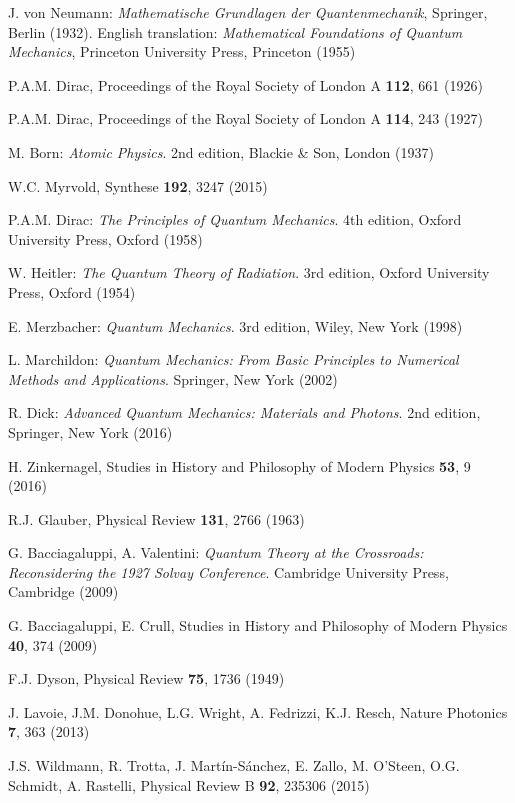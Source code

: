 \documentclass[final,3p,times,twocolumn]{elsarticle3}
\begin{document}
\begin{thebibliography}{88}
J. von Neumann: {\it Mathematische Grundlagen der Quantenmechanik},
Springer, Berlin (1932). English translation:
{\it Mathematical Foundations of Quantum Mechanics},
Princeton University Press, Princeton (1955)

P.A.M. Dirac,
Proceedings of the Royal Society of London A {\bf 112}, 661 (1926)

P.A.M. Dirac,
Proceedings of the Royal Society of London A {\bf 114}, 243 (1927)

M. Born: {\it Atomic Physics}. 2nd edition, Blackie \& Son, London (1937)

W.C. Myrvold, Synthese {\bf 192}, 3247 (2015)

P.A.M. Dirac: {\it The Principles of Quantum Mechanics}. 4th edition,
Oxford University Press, Oxford (1958)

W. Heitler: {\it The Quantum Theory of Radiation}. 3rd edition,
Oxford University Press, Oxford (1954)

E. Merzbacher: {\it Quantum Mechanics}. 3rd edition, Wiley, New York (1998)

L. Marchildon: {\it Quantum Mechanics: From Basic Principles to Numerical 
Methods and Applications}. Springer, New York (2002)

R. Dick: {\it Advanced Quantum Mechanics: Materials and Photons}.
2nd edition, Springer, New York (2016)

H. Zinkernagel, Studies in History and Philosophy of Modern Physics {\bf 53}, 9 (2016)

R.J. Glauber, Physical Review {\bf 131}, 2766 (1963)

G. Bacciagaluppi, A. Valentini: {\it Quantum Theory at the Crossroads:
Reconsidering the 1927 Solvay Conference}. Cambridge University Press, 
Cambridge (2009)

G. Bacciagaluppi, E. Crull, 
Studies in History and Philosophy of Modern Physics {\bf 40}, 374 (2009)

F.J. Dyson, Physical Review {\bf 75}, 1736 (1949)

J. Lavoie, J.M. Donohue, L.G. Wright, A. Fedrizzi,
K.J. Resch, Nature Photonics {\bf 7}, 363 (2013)

J.S. Wildmann, R. Trotta, J. Mart\'in-S\'anchez, E. Zallo,
M. O'Steen, O.G. Schmidt,  A. Rastelli,
Physical Review B {\bf 92}, 235306 (2015)


\end{thebibliography}
\end{document}
